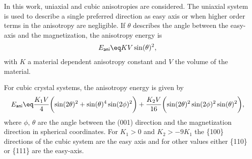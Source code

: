 \documentclass[\main/dresen_thesis.tex]{subfiles}
\begin{document}
      In this work, uniaxial and cubic anisotropies are considered.
      The uniaxial system is used to describe a single preferred direction as easy axis or when higher order terms in the anisotropy are negligible.
      If $\theta$ describes the angle between the easy-axis and the magnetization, the anisotropy energy is
      \begin{align}
        E_\mathsf{ani} \eq K V \sin(\theta)^2,
      \end{align}
      with $K$ a material dependent anisotropy constant and $V$ the volume of the material.

      For cubic crystal systems, the anisotropy energy is given by
      \begin{align}
        E_\mathsf{ani} \eq
          \frac{K_1 V}{4} \biggl(\sin(2 \theta)^2 + \sin(\theta)^4 \sin(2\phi)^2 \biggr) +
          \frac{K_2 V}{16} \biggl( \sin(2 \theta)^2 \sin(2 \phi)^2 \sin(\theta)^2 \biggr),
      \end{align}
      where $\phi, \, \theta$ are the angle between the (001) direction and the magnetization direction in spherical coordinates.
      For $K_1 > 0$ and $K_2 > -9 K_1$ the \{100\} directions of the cubic system are the easy axis and for other values either \{110\} or \{111\} are the easy-axis.
\end{document}
